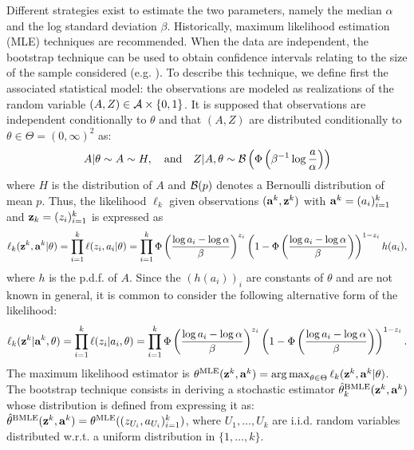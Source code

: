 Different strategies exist to estimate the two parameters, namely the median $\alpha$ and the log standard deviation $\beta$. Historically, maximum likelihood estimation (MLE) techniques are recommended.  %
When the data are independent, the bootstrap technique can be used to obtain confidence intervals relating to the size of the sample considered (e.g. \cite{shinozuka_statistical_2000,zentner_numerical_2010,wang_influence_2020}). %
To describe this technique,
we define first the associated statistical model: the observations are modeled as realizations of the random variable $(A,Z)\in\mathcal{A}\times\{0,1\}$. It is supposed that observations are independent conditionally to $\theta$ and that $(A,Z)$ are distributed conditionally to $\theta\in\Theta=(0,\infty)^2$ as:
    \begin{equation}
            A|\theta\sim A\sim H,\quad\text{and}\quad Z|A,\theta\sim\mathcal{B}\left(\Phi\left(\beta^{-1}\log\frac{a}{\alpha}\right)\right)
    \end{equation}
where $H$ is the distribution of $A$ and $\mathcal{B}(p)$ denotes a Bernoulli distribution of mean  $p$.
Thus, the likelihood $\ell_k$ given observations $(\mathbf{a}^k,\mathbf{z}^k)$ with $\mathbf{a}^k=(a_i)_{i=1}^k$ and $\mathbf{z}_k=(z_i)_{i=1}^{k}$ is expressed as
    \begin{equation}
        \ell_k(\mathbf{z}^k,\mathbf{a}^k|\theta) = \prod_{i=1}^k\ell(z_i,a_i|\theta) = \prod_{i=1}^k\Phi\left(\frac{\log a_i-\log\alpha}{\beta}\right)^{z_i}\left(1-\Phi\left(\frac{\log a_i-\log\alpha}{\beta}\right)\right)^{1-z_i}h(a_i),
    \end{equation}
where $h$ is the p.d.f. of $A$. Since the $(h(a_i))_i$ are constants of $\theta$ and are not known in general, it is common to consider the following alternative form of the likelihood:
\begin{equation}
    \ell_k(\mathbf{z}^k|\mathbf{a}^k,\theta) = \prod_{i=1}^k\ell(z_i|a_i,\theta) = \prod_{i=1}^k\Phi\left(\frac{\log a_i-\log\alpha}{\beta}\right)^{z_i}\left(1-\Phi\left(\frac{\log a_i-\log\alpha}{\beta}\right)\right)^{1-z_i}.
\end{equation}
The maximum likelihood estimator is $\theta^{\text{MLE}}(\mathbf{z}^k,\mathbf{a}^k)=\operatorname*{arg\,max}_{\theta\in\Theta}\ell_k(\mathbf{z}^k,\mathbf{a}^k|\theta)$.
The bootstrap technique consists in deriving a stochastic estimator $\hat\theta_k^{\text{BMLE}}(\mathbf{z}^k,\mathbf{a}^k)$ whose distribution is defined from expressing it as: $\hat\theta^{\text{BMLE}}(\mathbf{z}^k,\mathbf{a}^k)=\theta^{\text{MLE}}((z_{U_i},a_{U_i})_{i=1}^k)$, where $U_1,\dots,U_k$ are i.i.d. random variables distributed w.r.t. a uniform distribution in $\{1,\dots,k\}$.



